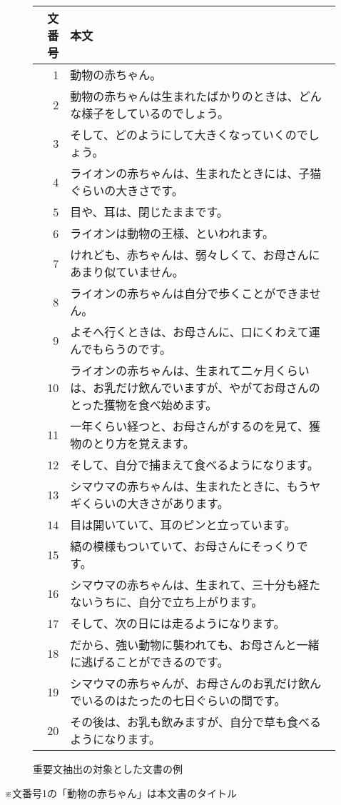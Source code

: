 \begin{figure}[htb]

\begin{small}

\begin{tabular}{|r|p{350pt}|}\hline
文番号&	本文 \\ \hline
     1&	動物の赤ちゃん。\\
     2&	動物の赤ちゃんは生まれたばかりのときは、どんな様子をしているのでしょう。 \\
     3&	そして、どのようにして大きくなっていくのでしょう。\\
     4&	ライオンの赤ちゃんは、生まれたときには、子猫ぐらいの大きさです。\\
     5&	目や、耳は、閉じたままです。\\
     6&	ライオンは動物の王様、といわれます。\\
     7&	けれども、赤ちゃんは、弱々しくて、お母さんにあまり似ていません。\\
     8&	ライオンの赤ちゃんは自分で歩くことができません。\\
     9&	よそへ行くときは、お母さんに、口にくわえて運んでもらうのです。\\
    10&	ライオンの赤ちゃんは、生まれて二ヶ月くらいは、お乳だけ飲んでいますが、やがてお母さんのとった獲物を食べ始めます。\\
    11&	一年くらい経つと、お母さんがするのを見て、獲物のとり方を覚えます。\\
    12&	そして、自分で捕まえて食べるようになります。\\
    13&	シマウマの赤ちゃんは、生まれたときに、もうヤギくらいの大きさがあります。\\
    14&	目は開いていて、耳のピンと立っています。\\
    15&	縞の模様もついていて、お母さんにそっくりです。\\
    16&	シマウマの赤ちゃんは、生まれて、三十分も経たないうちに、自分で立ち上がります。\\
    17&	そして、次の日には走るようになります。\\
    18&	だから、強い動物に襲われても、お母さんと一緒に逃げることができるのです。\\
    19&	シマウマの赤ちゃんが、お母さんのお乳だけ飲んでいるのはたったの七日ぐらいの間です。\\
    20&	その後は、お乳も飲みますが、自分で草も食べるようになります。\\ \hline
\end{tabular}
\end{small}

\caption{重要文抽出の対象とした文書の例}\label{document}


\end{figure}
※文番号1の「動物の赤ちゃん」は本文書のタイトル

